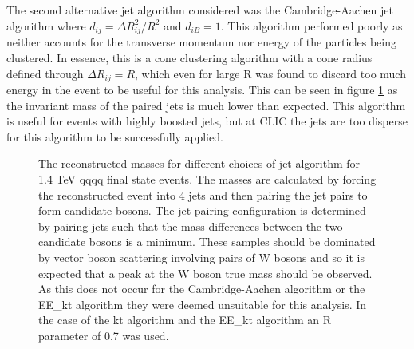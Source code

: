 The second alternative jet algorithm considered was the Cambridge-Aachen jet algorithm where $d_{ij} = {\Delta}R_{ij}^{2}/R^2$ and $d_{iB} = 1$.  This algorithm performed poorly as neither accounts for the transverse momentum nor energy of the particles being clustered. In essence, this is a cone clustering algorithm with a cone radius defined through ${\Delta}R_{ij} = R$, which even for large R was found to discard too much energy in the event to be useful for this analysis.  This can be seen in figure \ref{fig:invariantmassalgoveto} as the invariant mass of the paired jets is much lower than expected.  This algorithm is useful for events with highly boosted jets, but at CLIC the jets are too disperse for this algorithm to be successfully applied.

\begin{figure}[h!]
\centering
{}
\caption[The reconstructed masses for different choices of jet algorithm for 1.4 TeV \nu{\nu}qqqq final state events.  The masses are calculated by forcing the reconstructed event into 4 jets and then pairing the jet pairs to form candidate bosons.  The jet pairing configuration is determined by pairing jets such that the mass differences between the two candidate bosons is a minimum.  These samples should be dominated by vector boson scattering involving pairs of W bosons and so it is expected that a peak at the W boson true mass should be observed.  As this does not occur for the Cambridge-Aachen algorithm or the EE\_kt algorithm they were deemed unsuitable for this analysis. In the case of the kt algorithm and the EE\_kt algorithm an R parameter of 0.7 was used.]{The reconstructed masses for different choices of jet algorithm for 1.4 TeV \nu{\nu}qqqq final state events.  The masses are calculated by forcing the reconstructed event into 4 jets and then pairing the jet pairs to form candidate bosons.  The jet pairing configuration is determined by pairing jets such that the mass differences between the two candidate bosons is a minimum.  These samples should be dominated by vector boson scattering involving pairs of W bosons and so it is expected that a peak at the W boson true mass should be observed.  As this does not occur for the Cambridge-Aachen algorithm or the EE\_kt algorithm they were deemed unsuitable for this analysis. In the case of the kt algorithm and the EE\_kt algorithm an R parameter of 0.7 was used.}
\label{fig:invariantmassalgoveto}
\end{figure}

